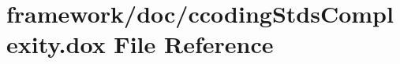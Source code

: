 \hypertarget{ccoding_stds_complexity_8dox}{}\section{framework/doc/ccoding\+Stds\+Complexity.dox File Reference}
\label{ccoding_stds_complexity_8dox}
